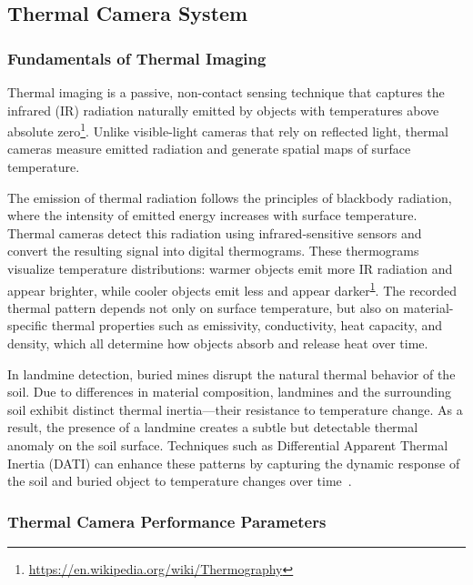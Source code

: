 \subsection{Thermal Camera System}

\subsubsection{Fundamentals of Thermal Imaging}

Thermal imaging is a passive, non-contact sensing technique that captures the infrared (IR) radiation naturally emitted by objects with temperatures above absolute zero\footnote{\label{thermography}\url{https://en.wikipedia.org/wiki/Thermography}}. Unlike visible-light cameras that rely on reflected light, thermal cameras measure emitted radiation and generate spatial maps of surface temperature.

The emission of thermal radiation follows the principles of blackbody radiation, where the intensity of emitted energy increases with surface temperature. Thermal cameras detect this radiation using infrared-sensitive sensors and convert the resulting signal into digital thermograms. These thermograms visualize temperature distributions: warmer objects emit more IR radiation and appear brighter, while cooler objects emit less and appear darker\textsuperscript{\ref{thermography}}. The recorded thermal pattern depends not only on surface temperature, but also on material-specific thermal properties such as emissivity, conductivity, heat capacity, and density, which all determine how objects absorb and release heat over time.

In landmine detection, buried mines disrupt the natural thermal behavior of the soil. Due to differences in material composition, landmines and the surrounding soil exhibit distinct thermal inertia—their resistance to temperature change. As a result, the presence of a landmine creates a subtle but detectable thermal anomaly on the soil surface. Techniques such as Differential Apparent Thermal Inertia (DATI) can enhance these patterns by capturing the dynamic response of the soil and buried object to temperature changes over time~\cite{nikulin2018detection}.



\subsubsection{Thermal Camera Performance Parameters}


